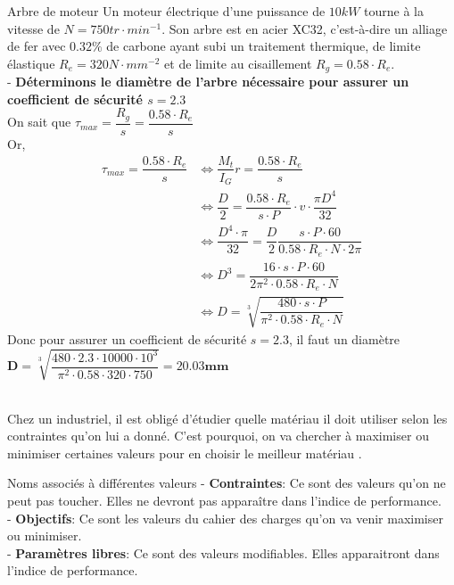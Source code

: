 \documentclass{article}
\begin{document}
{\begin{exemple}{Arbre de moteur}
Un moteur électrique d'une puissance de $10 kW$ tourne à la vitesse de $N=750 tr\cdot min^{-1}$. Son arbre est en acier XC32, c'est-à-dire un alliage de fer avec $0.32 \%$ de carbone ayant subi un traitement thermique, de limite élastique $R_e=320 N\cdot mm^{-2}$ et de limite au cisaillement $R_g=0.58\cdot R_e$.\\
- \textbf{Déterminons le diamètre de l'arbre nécessaire pour assurer un coefficient de sécurité $s=2.3$}\\
On sait que $\tau_{max}=\dfrac{R_g}{s}=\dfrac{0.58\cdot R_e}{s}$\\
Or,
\begin{align*}
\tau_{max}=\dfrac{0.58\cdot R_e}{s} &\iff \dfrac{M_t}{I_G}r=\dfrac{0.58\cdot R_e}{s}\\
&\iff \dfrac{D}{2}=\dfrac{0.58\cdot R_e}{s\cdot P}\cdot v \cdot \dfrac{\pi D^4}{32}\\
&\iff \dfrac{D^4\cdot \pi}{32}=\dfrac{D}{2}\dfrac{s\cdot P \cdot 60}{0.58\cdot R_e \cdot N \cdot 2\pi}\\
&\iff D^3 = \dfrac{16 \cdot s \cdot P \cdot 60}{2\pi^2 \cdot 0.58 \cdot R_e \cdot N}\\
&\iff D = \sqrt[3]{\dfrac{480 \cdot s \cdot P}{\pi^2 \cdot 0.58 \cdot R_e \cdot N}}
\end{align*}
Donc pour assurer un coefficient de sécurité $s=2.3$, il faut un diamètre $\bm D = \sqrt[3]{\dfrac{480 \cdot 2.3 \cdot 10000 \cdot 10^3}{\pi^2 \cdot 0.58 \cdot 320 \cdot 750}}=\bm{20.03 mm}$
\end{exemple}
{}
\vspace*{4pt} \\
Chez un industriel, il est obligé d'étudier quelle matériau il doit utiliser selon les contraintes qu'on lui a donné. C'est pourquoi, on va chercher à maximiser ou minimiser certaines valeurs pour en choisir le meilleur matériau .
\begin{vocabulaire}{Noms associés à différentes valeurs}
- \textbf{Contraintes}: Ce sont des valeurs qu'on ne peut pas toucher. Elles ne devront pas apparaître dans l'indice de performance.\\
- \textbf{Objectifs}: Ce sont les valeurs du cahier des charges qu'on va venir maximiser ou minimiser.\\
- \textbf{Paramètres libres}: Ce sont des valeurs modifiables. Elles apparaitront dans l'indice de performance.

\end{vocabulaire}}
\end{document}

